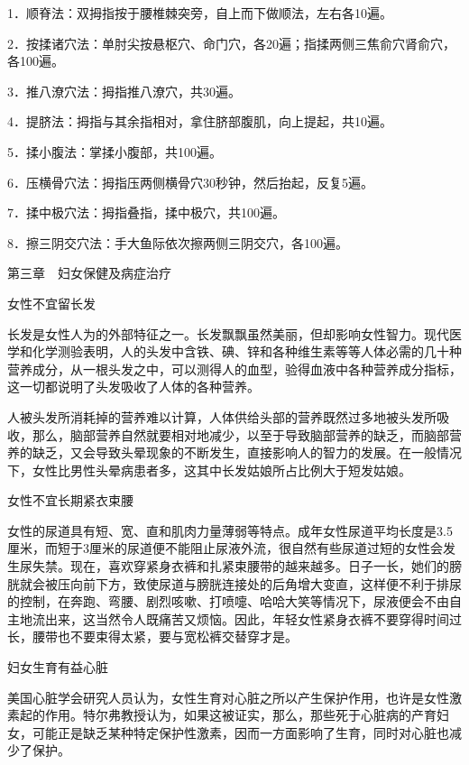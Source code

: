 \documentclass[12pt,UTF8]{ctexbook}
\begin{document}
1．顺脊法：双拇指按于腰椎棘突旁，自上而下做顺法，左右各10遍。

2．按揉诸穴法：单肘尖按悬枢穴、命门穴，各20遍；指揉两侧三焦俞穴肾俞穴，各100遍。

3．推八潦穴法：拇指推八潦穴，共30遍。

4．提脐法：拇指与其余指相对，拿住脐部腹肌，向上提起，共10遍。

5．揉小腹法：掌揉小腹部，共100遍。

6．压横骨穴法：拇指压两侧横骨穴30秒钟，然后抬起，反复5遍。

7．揉中极穴法：拇指叠指，揉中极穴，共100遍。

8．擦三阴交穴法：手大鱼际依次擦两侧三阴交穴，各100遍。





第三章　妇女保健及病症治疗


女性不宜留长发


长发是女性人为的外部特征之一。长发飘飘虽然美丽，但却影响女性智力。现代医学和化学测验表明，人的头发中含铁、碘、锌和各种维生素等等人体必需的几十种营养成分，从一根头发之中，可以测得人的血型，验得血液中各种营养成分指标，这一切都说明了头发吸收了人体的各种营养。

人被头发所消耗掉的营养难以计算，人体供给头部的营养既然过多地被头发所吸收，那么，脑部营养自然就要相对地减少，以至于导致脑部营养的缺乏，而脑部营养的缺乏，又会导致头晕现象的不断发生，直接影响人的智力的发展。在一般情况下，女性比男性头晕病患者多，这其中长发姑娘所占比例大于短发姑娘。





女性不宜长期紧衣束腰


女性的尿道具有短、宽、直和肌肉力量薄弱等特点。成年女性尿道平均长度是3.5厘米，而短于3厘米的尿道便不能阻止尿液外流，很自然有些尿道过短的女性会发生尿失禁。现在，喜欢穿紧身衣裤和扎紧束腰带的越来越多。日子一长，她们的膀胱就会被压向前下方，致使尿道与膀胱连接处的后角增大变直，这样便不利于排尿的控制，在奔跑、弯腰、剧烈咳嗽、打喷嚏、哈哈大笑等情况下，尿液便会不由自主地流出来，这当然令人既痛苦又烦恼。因此，年轻女性紧身衣裤不要穿得时间过长，腰带也不要束得太紧，要与宽松裤交替穿才是。





妇女生育有益心脏


美国心脏学会研究人员认为，女性生育对心脏之所以产生保护作用，也许是女性激素起的作用。特尔弗教授认为，如果这被证实，那么，那些死于心脏病的产育妇女，可能正是缺乏某种特定保护性激素，因而一方面影响了生育，同时对心脏也减少了保护。
\end{document}
